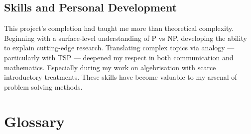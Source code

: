 \documentclass[12pt]{report}
\begin{document}
\section*{Skills and Personal Development}
This project's completion had taught me more than theoretical complexity.
Beginning with a surface-level understanding of P vs NP, developing the ability to explain cutting-edge research.
Translating complex topics via analogy --- particularly with TSP --- deepened my respect in both communication and mathematics.
Especially during my work on algebrisation with scarce introductory treatments.
These skills have become valuable to my arsenal of problem solving methods.




\newpage
\chapter*{Glossary}
\end{document}
